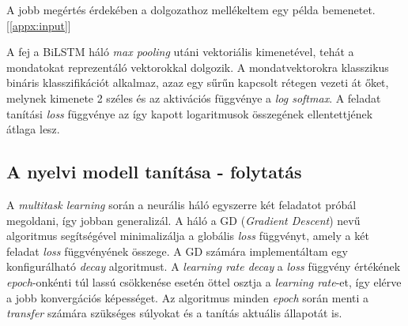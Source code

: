 \begin{note}
	A jobb megértés érdekében a dolgozathoz mellékeltem egy példa bemenetet. [\ref{appx:input}]
\end{note}

A fej a BiLSTM háló \textit{max pooling} utáni vektoriális kimenetével, tehát a mondatokat reprezentáló vektorokkal dolgozik. A mondatvektorokra klasszikus bináris klasszifikációt alkalmaz, azaz egy sűrűn kapcsolt rétegen vezeti át őket, melynek kimenete 2 széles és az aktivációs függvénye a \textit{log softmax}. A feladat tanítási \textit{loss} függvénye az így kapott logaritmusok összegének ellentettjének átlaga lesz.

\subsection*{A nyelvi modell tanítása - folytatás}
A \textit{multitask learning} során a neurális háló egyszerre két feladatot próbál megoldani, így jobban generalizál. A háló a GD (\textit{Gradient Descent}) nevű algoritmus segítségével minimalizálja a globális \textit{loss} függvényt, amely a két feladat \textit{loss} függvényének összege.
A GD számára implementáltam egy konfigurálható \textit{decay} algoritmust. A \textit{learning rate decay} a \textit{loss} függvény értékének \textit{epoch}-onkénti túl lassú csökkenése esetén öttel osztja a \textit{learning rate}-et, így elérve a jobb konvergációs képességet. Az algoritmus minden \textit{epoch} során menti a \textit{transfer} számára szükséges súlyokat és a tanítás aktuális állapotát is.

